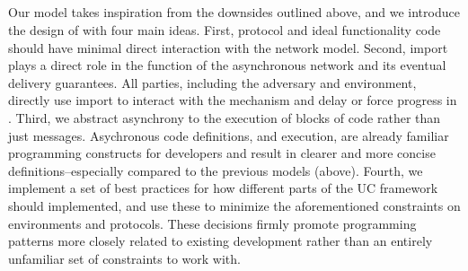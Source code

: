 %

\subsection{\fwrapper}
Our model takes inspiration from the downsides outlined above, and we introduce the design of \fwrapper with four main ideas.
First, protocol and ideal functionality code should have minimal direct interaction with the network model. 
Second, import plays a direct role in the function of the asynchronous network and its eventual delivery guarantees. 
All parties, including the adversary and environment, directly use import to interact with the mechanism and delay or force progress in \fwrapper.
Third, we abstract asynchrony to the execution of blocks of code rather than just messages.
Asychronous code definitions, and execution, are already familiar programming constructs for developers and result in clearer and more concise definitions--especially compared to the previous models (above).
Fourth, we implement a set of best practices for how different parts of the UC framework should implemented, and use these to minimize the aforementioned constraints on environments and protocols.
These decisions firmly promote programming patterns more closely related to existing development rather than an entirely unfamiliar set of constraints to work with. 

